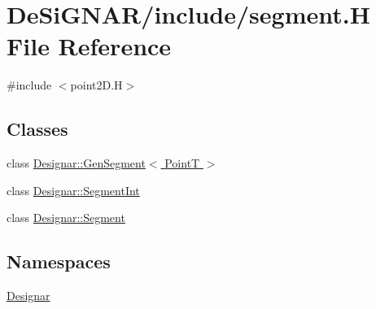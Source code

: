 \hypertarget{segment_8_h}{}\section{De\+Si\+G\+N\+A\+R/include/segment.H File Reference}
\label{segment_8_h}
{\ttfamily \#include $<$point2\+D.\+H$>$}\newline
\subsection*{Classes}
\begin{DoxyCompactItemize}
\item 
class \hyperlink{class_designar_1_1_gen_segment}{Designar\+::\+Gen\+Segment$<$ Point\+T $>$}
\item 
class \hyperlink{class_designar_1_1_segment_int}{Designar\+::\+Segment\+Int}
\item 
class \hyperlink{class_designar_1_1_segment}{Designar\+::\+Segment}
\end{DoxyCompactItemize}
\subsection*{Namespaces}
\begin{DoxyCompactItemize}
\item 
 \hyperlink{namespace_designar}{Designar}
\end{DoxyCompactItemize}
